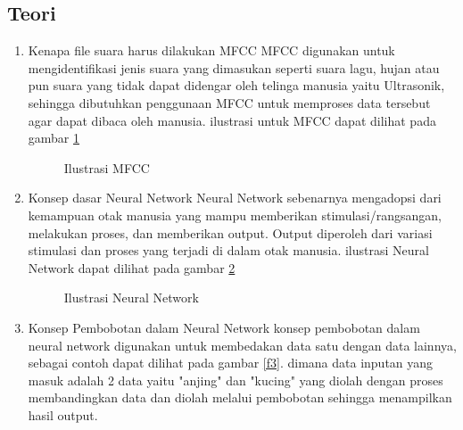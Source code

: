 \subsection{Teori}
\begin{enumerate}
\item Kenapa file suara harus dilakukan MFCC
\subitem MFCC digunakan untuk mengidentifikasi jenis suara yang dimasukan seperti suara lagu, hujan atau pun suara yang tidak dapat didengar oleh telinga manusia yaitu Ultrasonik, sehingga dibutuhkan penggunaan MFCC untuk memproses data tersebut agar dapat dibaca oleh manusia. ilustrasi untuk MFCC dapat dilihat pada gambar \ref{f1}

\begin{figure}[!htbp]
      \caption{Ilustrasi MFCC}
      \label{f1}
\end{figure}

\item Konsep dasar Neural Network
\subitem Neural Network sebenarnya mengadopsi dari kemampuan otak manusia yang mampu memberikan stimulasi/rangsangan, melakukan proses, dan memberikan output. Output diperoleh dari variasi stimulasi dan proses yang terjadi di dalam otak manusia.
ilustrasi Neural Network dapat dilihat pada gambar \ref{f2}

\begin{figure}[!htbp]
      \caption{Ilustrasi Neural Network}
      \label{f2}
\end{figure}

\item Konsep Pembobotan dalam Neural Network
\subitem konsep pembobotan dalam neural network digunakan untuk membedakan data satu dengan data lainnya, sebagai contoh dapat dilihat pada gambar \ref{f3}. dimana data inputan yang masuk adalah 2 data yaitu "anjing" dan "kucing" yang diolah dengan proses membandingkan data dan diolah melalui pembobotan sehingga menampilkan hasil output.


\end{enumerate}
